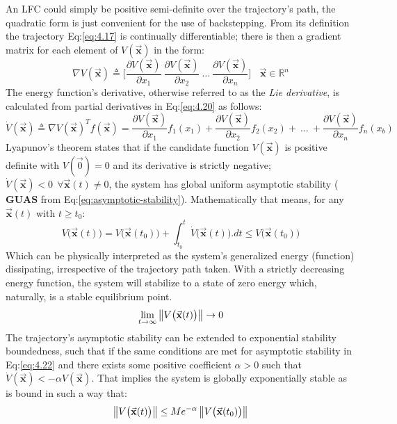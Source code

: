 An LFC could simply be positive semi-definite over the trajectory's path, the quadratic form is just convenient for the use of backstepping. From its definition the trajectory Eq:\ref{eq:4.17} is continually differentiable; there is then a gradient matrix for each element of $V(\vec{\mathbf{x}})$ in the form:
\begin{equation}\label{eq:4.20}
\nabla V(\vec{\mathbf{x}})\triangleq\bigg[\frac{\partial V(\vec{\mathbf{x}})}{\partial x_1}~\frac{\partial V(\vec{\mathbf{x}})}{\partial x_2}~\ldots~\frac{\partial V(\vec{\mathbf{x}})}{\partial x_n}\bigg]~~~~\vec{\mathbf{x}}\in\mathbb{R}^n
\end{equation}
The energy function's derivative, otherwise referred to as the \emph{Lie derivative}, is calculated from partial derivatives in Eq:\ref{eq:4.20} as follows:
\begin{equation}
\dot{V}(\vec{\mathbf{x}})\triangleq\nabla V(\vec{\mathbf{x}})^Tf(\vec{\mathbf{x}})=\frac{\partial V(\vec{\mathbf{x}})}{\partial x_1}f_1(x_1)+\frac{\partial V(\vec{\mathbf{x}})}{\partial x_2}f_2(x_2)+~\ldots~+\frac{\partial V(\vec{\mathbf{x}})}{\partial x_n}f_n(x_b)
\end{equation}
Lyapunov's theorem states that if the candidate function $V(\vec{\mathbf{x}})$ is positive definite with $V(\vec{0})=0$ and its derivative is strictly negative; $\dot{V}(\vec{\mathbf{x}})< 0~~\forall \vec{\mathbf{x}}(t) \not= 0$, the system has global uniform asymptotic stability ($\mathbf{GUAS}$ from Eq:\ref{eq:asymptotic-stability}). Mathematically that means, for any $\vec{\mathbf{x}}(t)$ with $t\geq t_0$:
\begin{equation}\label{eq:4.22}
V\big(\vec{\mathbf{x}}(t)\big)=V\big(\vec{\mathbf{x}}(t_0)\big)+\int_{t_0}^t \dot{V}\big(\vec{\mathbf{x}}(t)\big).dt \leq V\big(\vec{\mathbf{x}}(t_0)\big)
\end{equation}
Which can be physically interpreted as the system's generalized energy (function) dissipating, irrespective of the trajectory path taken. With a strictly decreasing energy function, the system will stabilize to a state of zero energy which, naturally, is a stable equilibrium point.
\begin{equation}
\lim_{t\rightarrow\infty}\left\lVert V\big(\vec{\mathbf{x}}(t)\big)\right\rVert\rightarrow 0
\end{equation}
The trajectory's asymptotic stability can be extended to exponential stability boundedness, such that if the same conditions are met for asymptotic stability in Eq:\ref{eq:4.22} and there exists some positive coefficient $\alpha>0$ such that $\dot{V}(\vec{\mathbf{x}})<-\alpha V(\vec{\mathbf{x}})$. That implies the system is globally exponentially stable as is bound in such a way that:
\begin{equation}
\left\lVert V\big(\vec{\mathbf{x}}(t)\big)\right\rVert\leq Me^{-\alpha}\left\lVert V\big(\vec{\mathbf{x}}(t_0)\big)\right\rVert
\end{equation}
